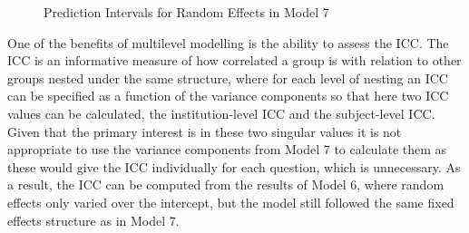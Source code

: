 \documentclass[11pt,a4paper]{report}
\begin{document}
\begin{figure}[h]
	\centering
		\caption{Prediction Intervals for Random Effects in Model 7}
		\label{fig:RaneffPredict}
\end{figure}

One of the benefits of multilevel modelling is the ability to assess the \ac{ICC}. The ICC is an informative measure of how correlated a group is with relation to other groups nested under the same structure, where for each level of nesting an ICC can be specified as a function of the variance components so that here two ICC values can be calculated, the institution-level ICC and the subject-level ICC. Given that the primary interest is in these two singular values it is not appropriate to use the variance components from Model 7 to calculate them as these would give the ICC individually for each question, which is unnecessary. As a result, the ICC can be computed from the results of Model 6, where random effects only varied over the intercept, but the model still followed the same fixed effects structure as in Model 7. 
\end{document}
